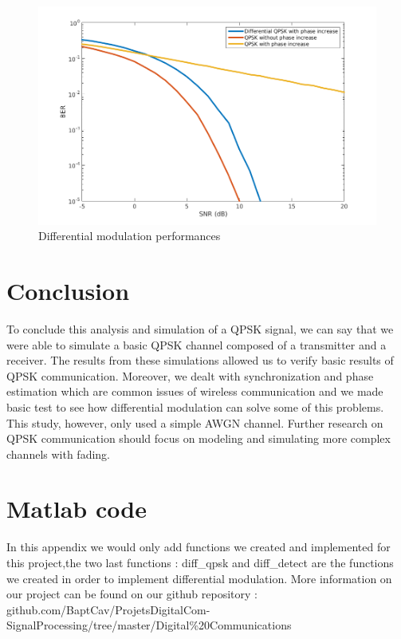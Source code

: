 \documentclass[a4paper,12pt]{article}
\begin{document}
\begin{figure}[ht!]
\centering
\begin{center}
\includegraphics[scale=0.55]{BER_phase_increase2.png}
\caption{Differential modulation performances}
\label{BERphase2}
\end{center}
\end{figure}

\section*{Conclusion}
To conclude this analysis and simulation of a QPSK signal, we can say that we were able to simulate a basic QPSK channel composed of a transmitter and a receiver. The results from these simulations allowed us to verify basic results of QPSK communication. Moreover, we dealt with synchronization and phase estimation which are common issues of wireless communication and we made basic test to see how differential modulation can solve some of this problems.\\

This study, however, only used a simple AWGN channel. Further research on QPSK communication should focus on modeling and simulating more complex channels with fading.




\appendix

\section*{Matlab code}
In this appendix we would only add functions we created and implemented for this project,the two last functions : diff\_qpsk and diff\_detect  are the functions we created in order to implement differential modulation. More information on our project can be found on our github repository : github.com/BaptCav/ProjetsDigitalCom-SignalProcessing/tree/master/Digital\%20Communications
\end{document}
